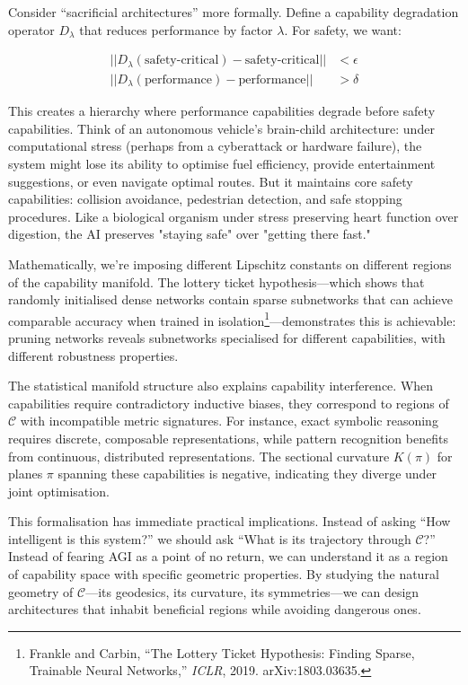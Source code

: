 \documentclass[acmsmall,screen]{acmart}
\begin{document}
Consider ``sacrificial architectures'' more formally. Define a capability degradation operator $D_\lambda$ that reduces performance by factor $\lambda$. For safety, we want:

\begin{align}
||D_\lambda(\text{safety-critical}) - \text{safety-critical}|| &< \epsilon \\
||D_\lambda(\text{performance}) - \text{performance}|| &> \delta
\end{align}

This creates a hierarchy where performance capabilities degrade before safety capabilities. Think of an autonomous vehicle's brain-child architecture: under computational stress (perhaps from a cyberattack or hardware failure), the system might lose its ability to optimise fuel efficiency, provide entertainment suggestions, or even navigate optimal routes. But it maintains core safety capabilities: collision avoidance, pedestrian detection, and safe stopping procedures. Like a biological organism under stress preserving heart function over digestion, the AI preserves "staying safe" over "getting there fast."

Mathematically, we're imposing different Lipschitz constants on different regions of the capability manifold. The lottery ticket hypothesis—which shows that randomly initialised dense networks contain sparse subnetworks that can achieve comparable accuracy when trained in isolation\footnote{Frankle and Carbin, ``The Lottery Ticket Hypothesis: Finding Sparse, Trainable Neural Networks,'' \textit{ICLR}, 2019. arXiv:1803.03635.}—demonstrates this is achievable: pruning networks reveals subnetworks specialised for different capabilities, with different robustness properties.

The statistical manifold structure also explains capability interference. When capabilities require contradictory inductive biases, they correspond to regions of $\mathcal{C}$ with incompatible metric signatures. For instance, exact symbolic reasoning requires discrete, composable representations, while pattern recognition benefits from continuous, distributed representations. The sectional curvature $K(\pi)$ for planes $\pi$ spanning these capabilities is negative, indicating they diverge under joint optimisation.

This formalisation has immediate practical implications. Instead of asking ``How intelligent is this system?'' we should ask ``What is its trajectory through $\mathcal{C}$?'' Instead of fearing AGI as a point of no return, we can understand it as a region of capability space with specific geometric properties. By studying the natural geometry of $\mathcal{C}$—its geodesics, its curvature, its symmetries—we can design architectures that inhabit beneficial regions while avoiding dangerous ones.
\end{document}
